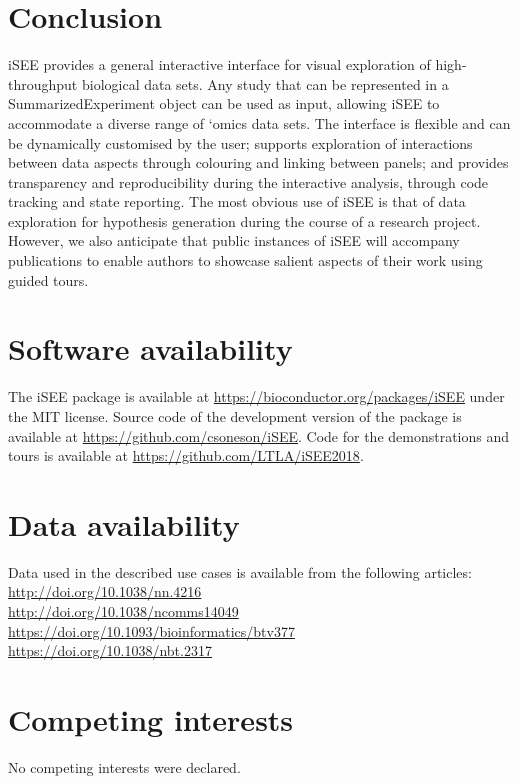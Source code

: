 \documentclass[10pt,a4paper,twocolumn]{article}
\begin{document}
\section*{Conclusion}
iSEE provides a general interactive interface for visual exploration of high-throughput biological data sets.
Any study that can be represented in a SummarizedExperiment object can be used as input, allowing iSEE to accommodate a diverse range of `omics data sets.
The interface is flexible and can be dynamically customised by the user; supports exploration of interactions between data aspects through colouring and linking between panels;
and provides transparency and reproducibility during the interactive analysis, through code tracking and state reporting. 
The most obvious use of iSEE is that of data exploration for hypothesis generation during the course of a research project.
However, we also anticipate that public instances of iSEE will accompany publications to enable authors to showcase salient aspects of their work using guided tours.

\section*{Software availability}
The iSEE package is available at \url{https://bioconductor.org/packages/iSEE} under the MIT license.
Source code of the development version of the package is available at \url{https://github.com/csoneson/iSEE}.
Code for the demonstrations and tours is available at \url{https://github.com/LTLA/iSEE2018}.

\section*{Data availability }
Data used in the described use cases is available from the following articles: \\
\url{http://doi.org/10.1038/nn.4216}\citep{tasic2016allen} \\
\url{http://doi.org/10.1038/ncomms14049}\citep{zheng2017massively} \\
\url{https://doi.org/10.1093/bioinformatics/btv377}\citep{piccolo2015TCGA} \\
\url{https://doi.org/10.1038/nbt.2317}\citep{bodenmiller2012cytof} \\

\section*{Competing interests}
No competing interests were declared.
\end{document}
